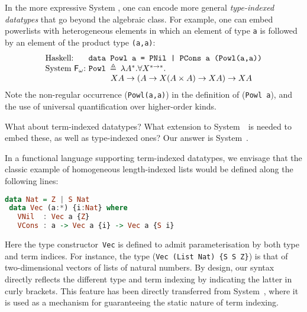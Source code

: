 In the more expressive System \Fw, one can encode more general
\emph{type-indexed datatypes} that go beyond the algebraic class.
For example, one can embed powerlists with
heterogeneous elements in which an element of type \texttt{a} is followed by
an element of the product type \texttt{(a,a)}:
\[
\begin{array}{ll}
\text{Haskell:} & \!\!\!\!\texttt{data Powl a = PNil | PCons a (Powl(a,a))} \\
\text{System \Fw:} & \!\!\!\!\texttt{{Powl}}\:\triangleq\:
\lambda A^{*}.\forall X^{*\to*}.\\ \qquad
& \qquad X A\to (A\to X(A\times A)\to X A)\to XA
\end{array}
\]
Note the non-regular occurrence (\texttt{Powl(a,a)}) in the definition of
(\texttt{Powl a}), and the use of universal quantification over
higher-order kinds.


What about term-indexed datatypes?  What extension to System~\Fw\ is
needed to embed these, as well as type-indexed ones?  Our answer is
System~\Fi.

In a functional language supporting term-indexed datatypes, we envisage
that the classic example of homogeneous length-indexed lists would be
defined along the following lines:
\begin{lstlisting}[basicstyle={\ttfamily},language=Haskell]
 data Nat = Z | S Nat
 data Vec (a:*) {i:Nat} where
   VNil  : Vec a {Z}
   VCons : a -> Vec a {i} -> Vec a {S i}
\end{lstlisting}\noindent
Here the type constructor~{\tt Vec} is defined to admit parameterisation
by both type and term indices.  For instance, the type 
(\verb|Vec (List Nat) {S S Z}|) is that of two-di\-men\-sion\-al
vectors of lists of natural numbers.  By design, our syntax directly
reflects the different type and term indexing by indicating the latter in
curly brackets.  This feature has been directly transferred from
System~\Fi, where it is used as a mechanism for guaranteeing the static
nature of term indexing.

